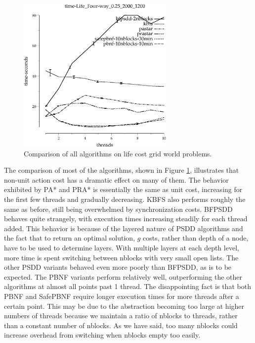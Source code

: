 \documentclass{article}
\begin{document}
\begin{figure}[h!]
\includegraphics[width=3in]{../graphs/seth/time-Life_Four-way_0.25_2000_1200.eps}
\caption{Comparison of all algorithms on life cost grid world problems.}
\label{fig:comp-life}
\end{figure}

The comparison of most of the algorithms, shown in Figure \ref{fig:comp-life}, illustrates that non-unit action cost has a dramatic effect on many of them. The behavior exhibited by PA* and PRA* is essentially the same as unit cost, increasing for the first few threads and gradually decreasing. KBFS also performs roughly the same as before, still being overwhelmed by synchronization costs. BFPSDD behaves quite strangely, with execution times increasing steadily for each thread added. This behavior is because of the layered nature of PSDD algorithms and the fact that to return an optimal solution, $g$ costs, rather than depth of a node, have to be used to determine layers. With multiple layers at each depth level, more time is spent switching between nblocks with very small open lists. The other PSDD variants behaved even more poorly than BFPSDD, as is to be expected. The PBNF variants perform relatively well, outperforming the other algorithms at almost all points past 1 thread. The disappointing fact is that both PBNF and SafePBNF require longer execution times for more threads after a certain point. This may be due to the abstraction becoming too large at higher numbers of threads because we maintain a ratio of nblocks to threads, rather than a constant number of nblocks. As we have said, too many nblocks could increase overhead from switching when nblocks empty too easily.
\end{document}

